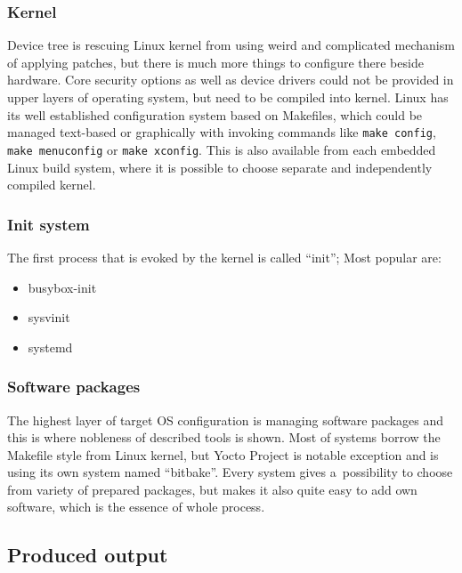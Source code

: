 \documentclass[printmode]{mgr}
\begin{document}
\subsubsection{Kernel}
Device tree is rescuing Linux kernel from using weird and complicated mechanism of applying patches, but there is much more things to configure there beside hardware.
Core security options as well as device drivers could not be provided in upper layers of operating system, but need to be compiled into kernel.
Linux has its well established configuration system based on Makefiles, which could be managed text-based or graphically with invoking commands like \verb|make config|, \verb|make menuconfig| or \verb|make xconfig|.
This is also available from each embedded Linux build system, where it is possible to choose separate and independently compiled kernel.

\subsubsection{Init system}

The first process that is evoked by the kernel is called ``init''; Most popular are:

\begin{itemize}
    \itemsep0em
    \item busybox-init
    \item sysvinit
    \item systemd
\end{itemize}

\subsubsection{Software packages}
The highest layer of target OS configuration is managing software packages and this is where nobleness of described tools is shown.
Most of systems borrow the Makefile style from Linux kernel, but Yocto Project is notable exception and is using its own system named ``bitbake''.
Every system gives a~possibility to choose from variety of prepared packages, but makes it also quite easy to add own software, which is the essence of whole process.

\subsection{Produced output}
\end{document}
